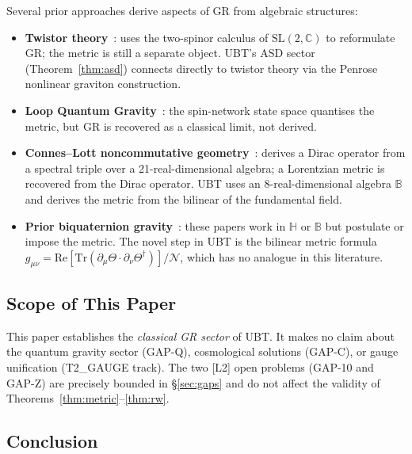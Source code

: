 \documentclass[12pt,a4paper]{article}
\theoremstyle{definition}
\theoremstyle{remark}
\newcommand{\BB}{\mathbb{B}}
\newcommand{\CC}{\mathbb{C}}
\newcommand{\HH}{\mathbb{H}}
\newcommand{\Tr}{\mathrm{Tr}}
\newcommand{\re}{\mathrm{Re}}
\newcommand{\calN}{\mathcal{N}}
\begin{document}
Several prior approaches derive aspects of GR from algebraic structures:

\begin{itemize}
  \item \textbf{Twistor theory}~\cite{penrose1976,penrose_rindler1984}:
        uses the two-spinor calculus of $\mathrm{SL}(2,\CC)$ to reformulate
        GR; the metric is still a separate object.
        UBT's ASD sector (Theorem~\ref{thm:asd}) connects directly to twistor
        theory via the Penrose nonlinear graviton construction.

  \item \textbf{Loop Quantum Gravity}~\cite{thiemann2007}:
        the spin-network state space quantises the metric, but GR is
        recovered as a classical limit, not derived.

  \item \textbf{Connes--Lott noncommutative geometry}~\cite{connes1991}:
        derives a Dirac operator from a spectral triple over a
        21-real-dimensional algebra; a Lorentzian metric is recovered
        from the Dirac operator.
        UBT uses an 8-real-dimensional algebra $\BB$ and derives the
        metric from the bilinear of the fundamental field.

  \item \textbf{Prior biquaternion gravity}~\cite{adler1995,finkelstein1962,deleo1996}:
        these papers work in $\HH$ or $\BB$ but postulate or impose the
        metric.
        The novel step in UBT is the bilinear metric formula
        $g_{\mu\nu} = \re[\Tr(\partial_\mu\Theta \cdot \partial_\nu\Theta^\dagger)]/\calN$,
        which has no analogue in this literature.
\end{itemize}

\subsection{Scope of This Paper}

This paper establishes the \emph{classical GR sector} of UBT.
It makes no claim about the quantum gravity sector (GAP-Q),
cosmological solutions (GAP-C), or gauge unification (T2\_GAUGE track).
The two [L2] open problems (GAP-10 and GAP-Z) are precisely bounded in
\S\ref{sec:gaps} and do not affect the validity of Theorems~\ref{thm:metric}--\ref{thm:rw}.

\subsection{Conclusion}
\end{document}
